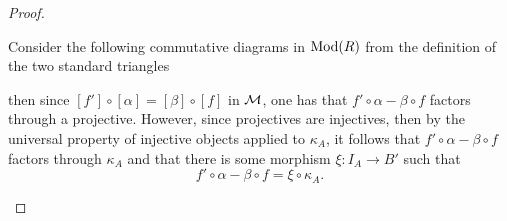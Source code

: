 \begin{proof}
\begin{enumerate}[label={(\bfseries TR\arabic*)}]
{            Consider the following commutative diagrams in \( \operatorname{Mod}(R) \) from the definition of the two standard triangles
            \begin{center}
            \end{center}
            then since \( [f'] \circ [\alpha] = [\beta] \circ [f] \) in \( {\mathcal{M}} \), one has that \( f' \circ \alpha - \beta \circ f \) factors through a projective. However, since projectives are injectives, then by the universal property of injective objects applied to \( \kappa_A \), it follows that \( f' \circ \alpha - \beta \circ f \) factors through \( \kappa_A \) and that there is some morphism \( \xi: I_A \to B' \) such that
            \[
                f' \circ \alpha - \beta \circ f = \xi \circ \kappa_A.
            \]

}
\end{enumerate}
\end{proof}
